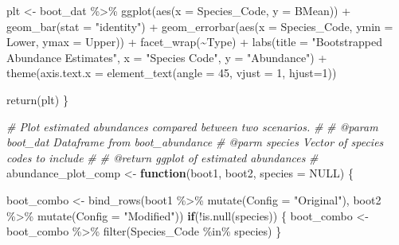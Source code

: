 \documentclass[
]{article}
\newenvironment{Shaded}{\begin{snugshade}}{\end{snugshade}}
\newcommand{\AttributeTok}[1]{\textcolor[rgb]{0.77,0.63,0.00}{#1}}
\newcommand{\CommentTok}[1]{\textcolor[rgb]{0.56,0.35,0.01}{\textit{#1}}}
\newcommand{\ConstantTok}[1]{\textcolor[rgb]{0.00,0.00,0.00}{#1}}
\newcommand{\ControlFlowTok}[1]{\textcolor[rgb]{0.13,0.29,0.53}{\textbf{#1}}}
\newcommand{\DecValTok}[1]{\textcolor[rgb]{0.00,0.00,0.81}{#1}}
\newcommand{\FunctionTok}[1]{\textcolor[rgb]{0.00,0.00,0.00}{#1}}
\newcommand{\NormalTok}[1]{#1}
\newcommand{\OtherTok}[1]{\textcolor[rgb]{0.56,0.35,0.01}{#1}}
\newcommand{\SpecialCharTok}[1]{\textcolor[rgb]{0.00,0.00,0.00}{#1}}
\newcommand{\StringTok}[1]{\textcolor[rgb]{0.31,0.60,0.02}{#1}}
\begin{document}
\begin{Shaded}
\begin{Highlighting}[]
\NormalTok{  plt }\OtherTok{\textless{}{-}}\NormalTok{ boot\_dat }\SpecialCharTok{\%\textgreater{}\%}
          \FunctionTok{ggplot}\NormalTok{(}\FunctionTok{aes}\NormalTok{(}\AttributeTok{x =}\NormalTok{ Species\_Code, }\AttributeTok{y =}\NormalTok{ BMean)) }\SpecialCharTok{+}
          \FunctionTok{geom\_bar}\NormalTok{(}\AttributeTok{stat =} \StringTok{"identity"}\NormalTok{) }\SpecialCharTok{+}
          \FunctionTok{geom\_errorbar}\NormalTok{(}\FunctionTok{aes}\NormalTok{(}\AttributeTok{x =}\NormalTok{ Species\_Code, }\AttributeTok{ymin =}\NormalTok{ Lower, }\AttributeTok{ymax =}\NormalTok{ Upper)) }\SpecialCharTok{+}
          \FunctionTok{facet\_wrap}\NormalTok{(}\SpecialCharTok{\textasciitilde{}}\NormalTok{Type) }\SpecialCharTok{+}
          \FunctionTok{labs}\NormalTok{(}\AttributeTok{title =} \StringTok{"Bootstrapped Abundance Estimates"}\NormalTok{,}
               \AttributeTok{x =} \StringTok{"Species Code"}\NormalTok{,}
               \AttributeTok{y =} \StringTok{"Abundance"}\NormalTok{) }\SpecialCharTok{+}
          \FunctionTok{theme}\NormalTok{(}\AttributeTok{axis.text.x =} \FunctionTok{element\_text}\NormalTok{(}\AttributeTok{angle =} \DecValTok{45}\NormalTok{, }\AttributeTok{vjust =} \DecValTok{1}\NormalTok{, }\AttributeTok{hjust=}\DecValTok{1}\NormalTok{)) }
  
  \FunctionTok{return}\NormalTok{(plt)}
\NormalTok{\}}

\CommentTok{\# Plot estimated abundances compared between two scenarios.}
\CommentTok{\# }
\CommentTok{\# @param boot\_dat Dataframe from boot\_abundance}
\CommentTok{\# @parm species Vector of species codes to include}
\CommentTok{\#}
\CommentTok{\# @return ggplot of estimated abundances}
\CommentTok{\#}
\NormalTok{abundance\_plot\_comp }\OtherTok{\textless{}{-}} \ControlFlowTok{function}\NormalTok{(boot1, boot2, }\AttributeTok{species =} \ConstantTok{NULL}\NormalTok{) \{}
  
\NormalTok{  boot\_combo }\OtherTok{\textless{}{-}} \FunctionTok{bind\_rows}\NormalTok{(boot1 }\SpecialCharTok{\%\textgreater{}\%}
                            \FunctionTok{mutate}\NormalTok{(}\AttributeTok{Config =} \StringTok{"Original"}\NormalTok{),}
\NormalTok{                          boot2 }\SpecialCharTok{\%\textgreater{}\%}
                            \FunctionTok{mutate}\NormalTok{(}\AttributeTok{Config =} \StringTok{"Modified"}\NormalTok{))}
  \ControlFlowTok{if}\NormalTok{(}\SpecialCharTok{!}\FunctionTok{is.null}\NormalTok{(species)) \{}
\NormalTok{    boot\_combo }\OtherTok{\textless{}{-}}\NormalTok{ boot\_combo }\SpecialCharTok{\%\textgreater{}\%}
                    \FunctionTok{filter}\NormalTok{(Species\_Code }\SpecialCharTok{\%in\%}\NormalTok{ species)}
\NormalTok{  \}}
  

\end{Highlighting}
\end{Shaded}
\end{document}
